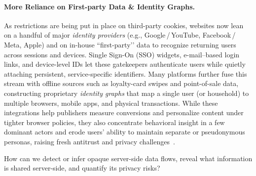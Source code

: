 \paragraph{More Reliance on First-party Data \& Identity Graphs.}
\label{sec:id-providers}
As restrictions are being put in place on third-party cookies, websites now lean on a handful of major \emph{identity providers} (e.g., Google\,/\,YouTube, Facebook\,/\,Meta, Apple) and on in-house ``first-party’’ data to recognize returning users across sessions and devices.
Single Sign-On (SSO) widgets, e-mail–based login links, and device-level IDs let these gatekeepers authenticate users while quietly attaching persistent, service-specific identifiers.
Many platforms further fuse this stream with offline sources such as loyalty-card swipes and point-of-sale data, constructing proprietary \emph{identity graphs} that map a single user (or household) to multiple browsers, mobile apps, and physical transactions.
%
While these integrations help publishers measure conversions and personalize content under tighter browser policies, they also concentrate behavioral insight in a few dominant actors and erode users’ ability to maintain separate or pseudonymous personas, raising fresh antitrust and privacy challenges~\cite{TargetedAdvertisingAutorite2025,khanAmazonsAntitrustParadox2017,munirGooglesChromeAntitrust2024}.

\begin{opbox}
How can we detect or infer opaque server-side data flows, reveal what information is shared server-side, and quantify its privacy risks?
\end{opbox}


